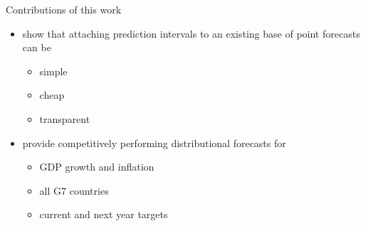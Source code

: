\documentclass[en]{sdqbeamer}
\begin{document}
\begin{frame}[t]{Contributions of this work}
\begin{itemize}
    \item show that attaching prediction intervals to an existing base of point forecasts can be 
    \begin{itemize} 
    \item simple
    \item cheap
    \item transparent
    \end{itemize}   
    \item provide competitively performing distributional forecasts for 
    \begin{itemize}
    \item  GDP growth and inflation
    \item  all G7 countries
    \item  current and next year targets
    \end{itemize}
\end{itemize}
\end{frame}

   
\end{document}
